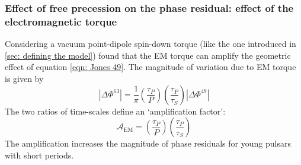 

\begin{figure}[htb]
\begin{floatrow}
\capbtabbox{%
  
}{%
  \caption{}%
  \label{tab: 49 verification properties}
}
\end{floatrow}
\end{figure}

\FloatBarrier
\subsubsection{Effect of free precession on the phase residual: effect of the 
            electromagnetic torque}
\label{sec: Effect of free precession on the phase residual: effect of the 
            electromagnetic torque}
Considering a vacuum point-dipole spin-down torque (like the one introduced in 
\ref{sec: defining the model}) \citet{Jones2001} found that the EM torque can
amplify the geometric effect of equation \eqref{eqn: Jones 49}. The magnitude
of variation due to EM torque is given by 
\begin{equation}
    |\Delta\Phi^{63}| = \frac{1}{\pi}\left(\frac{\tau_{P}}{P}\right)
    \left(\frac{\tau_{P}}{\tau_{S}}\right) 
                                    |\Delta\Phi^{49}|
\label{eqn: Jones 63}
\end{equation}
The two ratios of time-scales define an `amplification factor':
\begin{equation}
    \mathcal{A}_{\mathrm{EM}} = \left(\frac{\tau_{P}}{P}\right)
                                \left(\frac{\tau_{P}}{\tau_{S}}\right) 
\label{eqn: EM amplification}
\end{equation}
The amplification increases
the magnitude of phase residuals for young pulsars with short periods.

